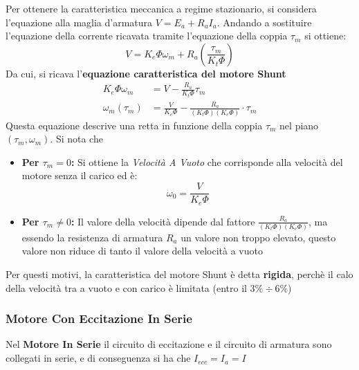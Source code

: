﻿\documentclass[11pt, a4paper]{article}
\begin{document}
Per ottenere la caratteristica meccanica a regime stazionario, si considera l'equazione alla maglia d'armatura $V = E_a + R_a I_a$. Andando a sostituire l'equazione della corrente ricavata tramite l'equazione della coppia $\tau_{m}$ si ottiene:
\[
    V = K_e \Phi \omega_m + R_a \left(\frac{\tau_m}{K_t \Phi}\right)
\]
Da cui, si ricava l'\textbf{equazione caratteristica del motore Shunt}
\begin{align*}
    K_e \Phi \omega_m &= V - \frac{R_a}{K_t \Phi} \tau_m\\
    \omega_m(\tau_m) &= \frac{V}{K_e \Phi} - \frac{R_a}{(K_t \Phi)(K_e \Phi)} \cdot \tau_m
\end{align*}
Questa equazione descrive una retta in funzione della coppia $\tau_{m}$ nel piano $(\tau_m, \omega_m)$. Si nota che
\begin{itemize}
    \item \textbf{Per $\tau_m = 0$:} Si ottiene la \textit{Velocità A Vuoto} che corrisponde alla velocità del motore senza il carico ed è:
    \[
        \omega_0 = \frac{V}{K_e \Phi}
    \]
    \item \textbf{Per $\tau_m \ne 0$:} Il valore della velocità dipende dal fattore $\frac{R_a}{(K_t \Phi)(K_e \Phi)}$, ma essendo la resistenza di armatura $R_{a}$ un valore non troppo elevato, questo valore non riduce di tanto il valore della velocità a vuoto
\end{itemize}
Per questi motivi, la caratteristica del motore Shunt è detta \textbf{rigida}, perchè il calo della velocità tra a vuoto e con carico è limitata (entro il $3\% \div 6\%$)
\newpage

\subsubsection{Motore Con Eccitazione In Serie}
Nel \textbf{Motore In Serie} il circuito di eccitazione e il circuito di armatura sono collegati in serie, e di conseguenza si ha che $I_{ecc} = I_{a} = I$
\end{document}
